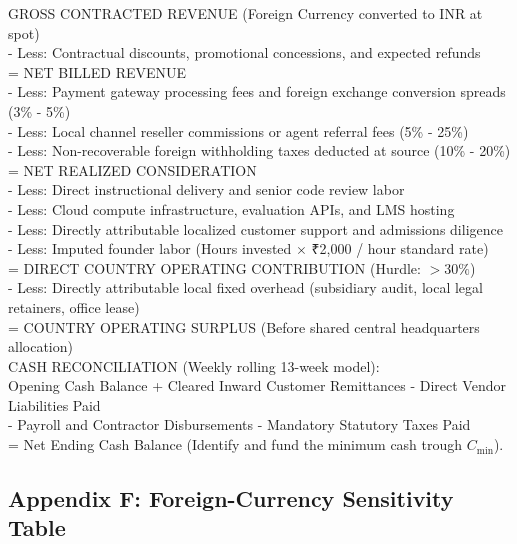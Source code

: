 \begin{tcolorbox}[colback=BayesCanvas,colframe=BayesDark,arc=1mm,title=\textbf{The Standard Country-Level P\&L and Cash Flow Architecture}]
\scriptsize\ttfamily
GROSS CONTRACTED REVENUE (Foreign Currency converted to INR at spot)\\
- Less: Contractual discounts, promotional concessions, and expected refunds\\
= NET BILLED REVENUE\\
- Less: Payment gateway processing fees and foreign exchange conversion spreads (3\% - 5\%)\\
- Less: Local channel reseller commissions or agent referral fees (5\% - 25\%)\\
- Less: Non-recoverable foreign withholding taxes deducted at source (10\% - 20\%)\\
= NET REALIZED CONSIDERATION\\
- Less: Direct instructional delivery and senior code review labor\\
- Less: Cloud compute infrastructure, evaluation APIs, and LMS hosting\\
- Less: Directly attributable localized customer support and admissions diligence\\
- Less: Imputed founder labor (Hours invested $\times$ \textnormal{₹}2,000 / hour standard rate)\\
= DIRECT COUNTRY OPERATING CONTRIBUTION (Hurdle: $>30\%$)\\
- Less: Directly attributable local fixed overhead (subsidiary audit, local legal retainers, office lease)\\
= COUNTRY OPERATING SURPLUS (Before shared central headquarters allocation)\\[6pt]
CASH RECONCILIATION (Weekly rolling 13-week model):\\
Opening Cash Balance + Cleared Inward Customer Remittances - Direct Vendor Liabilities Paid\\
- Payroll and Contractor Disbursements - Mandatory Statutory Taxes Paid\\
= Net Ending Cash Balance (Identify and fund the minimum cash trough $C_{\text{min}}$).
\end{tcolorbox}

\subsection{Appendix F: Foreign-Currency Sensitivity Table}

